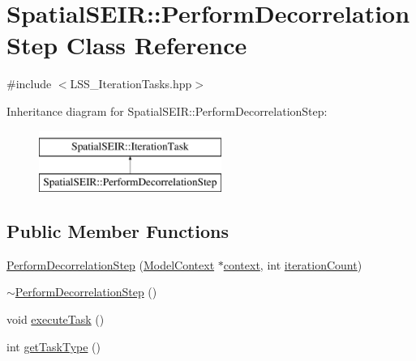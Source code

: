 \hypertarget{classSpatialSEIR_1_1PerformDecorrelationStep}{\section{Spatial\-S\-E\-I\-R\-:\-:Perform\-Decorrelation\-Step Class Reference}
\label{classSpatialSEIR_1_1PerformDecorrelationStep}
}


{\ttfamily \#include $<$L\-S\-S\-\_\-\-Iteration\-Tasks.\-hpp$>$}

Inheritance diagram for Spatial\-S\-E\-I\-R\-:\-:Perform\-Decorrelation\-Step\-:\begin{figure}[H]
\begin{center}
\leavevmode
\includegraphics[height=2.000000cm]{classSpatialSEIR_1_1PerformDecorrelationStep}
\end{center}
\end{figure}
\subsection*{Public Member Functions}
\begin{DoxyCompactItemize}
\item 
\hyperlink{classSpatialSEIR_1_1PerformDecorrelationStep_ae78265340fd46d9ff674ca7d6cbc86bf}{Perform\-Decorrelation\-Step} (\hyperlink{classSpatialSEIR_1_1ModelContext}{Model\-Context} $\ast$\hyperlink{classSpatialSEIR_1_1PerformDecorrelationStep_ad02138912341efd070e7f38a6743f014}{context}, int \hyperlink{classSpatialSEIR_1_1PerformDecorrelationStep_a78eb6b88ca3e77d7cb482ad30bbfa552}{iteration\-Count})
\item 
\hyperlink{classSpatialSEIR_1_1PerformDecorrelationStep_a9fe8a9b0a0b852f3bd83fb8ad4a2e3e6}{$\sim$\-Perform\-Decorrelation\-Step} ()
\item 
void \hyperlink{classSpatialSEIR_1_1PerformDecorrelationStep_a62dcdeaf7c8ce7482981c94570600363}{execute\-Task} ()
\item 
int \hyperlink{classSpatialSEIR_1_1PerformDecorrelationStep_a04fcb1e5d1c16ae563c034ea30467cc7}{get\-Task\-Type} ()
\end{DoxyCompactItemize}
